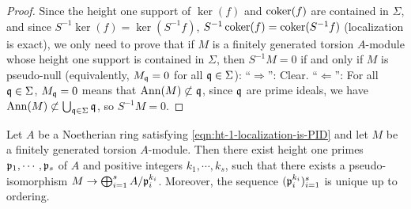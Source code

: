 \begin{proof}
Since the height one support of $\ker(f)$ and $\operatorname{coker}(f)$
are contained in $\Sigma$,
and since $S^{-1}\ker(f)=\ker(S^{-1}f)$,
$S^{-1}\operatorname{coker}(f)=\operatorname{coker}(S^{-1}f)$ (localization is exact),
we only need to prove that if $M$ is a finitely generated torsion $A$-module
whose height one support is contained in $\Sigma$,
then $S^{-1}M=0$ if and only if $M$ is pseudo-null (equivalently, $M_{\mathfrak{q}}=0$
for all ${\mathfrak{q}}\in\Sigma$):
``$\Rightarrow$'': Clear.
``$\Leftarrow$'': For all ${\mathfrak{q}}\in\Sigma$, $M_{\mathfrak{q}}=0$ means that ${\mathrm{Ann}}(M)\not\subset{\mathfrak{q}}$,
since ${\mathfrak{q}}$ are prime ideals, we have ${\mathrm{Ann}}(M)\not\subset\bigcup_{{\mathfrak{q}}\in\Sigma}{\mathfrak{q}}$,
so $S^{-1}M=0$.
\end{proof}

\begin{prop}
\label{structure-thm}
Let $A$ be a Noetherian ring satisfying \eqref{eqn:ht-1-localization-is-PID}
and let $M$ be a finitely generated torsion $A$-module.
Then there exist height one primes ${\mathfrak{p}}_1,\cdots,{\mathfrak{p}}_s$ of $A$
and positive integers $k_1,\cdots,k_s$, such that there exists a pseudo-isomorphism
$M\to\bigoplus_{i=1}^s A/{\mathfrak{p}}_i^{k_i}$.
Moreover, the sequence $({\mathfrak{p}}_i^{k_i})_{i=1}^s$ is unique up to ordering.
\end{prop}

